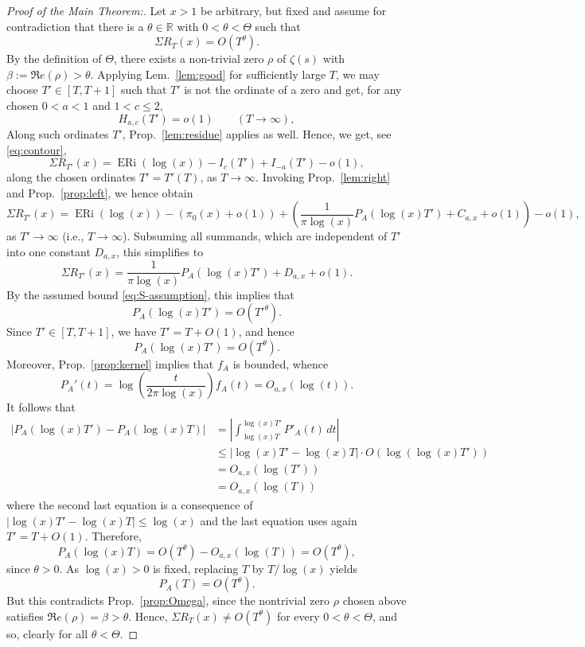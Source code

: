 \documentclass[a4paper,10pt]{amsart}
\DeclareMathOperator{\ERi}{ERi}
\theoremstyle{definition}
\numberwithin{equation}{section}
\def\R{\mathbb R}
\begin{document}
\begin{proof}[Proof of the Main Theorem:]
Let $x>1$ be arbitrary, but fixed and assume for contradiction that there is a $\theta\in\R$ with $0<\theta<\Theta$ such that
\begin{equation}\label{eq:S-assumption}
\Sigma R_T(x)=O(T^\theta).
\end{equation}
By the definition of $\Theta$, there exists a non-trivial zero $\rho$ of $\zeta(s)$ with $\beta:=\Re e(\rho)>\theta$. Applying Lem.\ \ref{lem:good} for sufficiently large $T$, we may choose $T'\in[T,T+1]$ such that $T'$ is not the ordinate of a zero and get, for any chosen $0<a<1$ and $1<c\leq 2$,
$$H_{a,c}(T')=o(1) \qquad(T\to\infty),$$
Along such ordinates $T'$, Prop.\ \ref{lem:residue} applies as well. Hence, we get, see \eqref{eq:contour},
\begin{equation}\label{eq:transfer-good}
\Sigma R_{T'}(x) = \ERi(\log(x))-I_c(T')+I_{-a}(T')-o(1),
\end{equation}
along the chosen ordinates $T'=T'(T)$, as $T\to\infty$. Invoking Prop.\ \ref{lem:right} and Prop.\ \ref{prop:left}, we hence obtain
$$ \Sigma R_{T'}(x) = \ERi(\log(x))-(\pi_0(x)+o(1))+\left(\frac1{\pi \log(x)}P_A(\log(x)T')+C_{a,x}+o(1)\right)-o(1),$$
as $T'\to\infty$ (i.e., $T\to\infty$). Subsuming all summands, which are independent of $T'$ into one constant $D_{a,x}$, this simplifies to
$$\Sigma R_{T'}(x) = \frac1{\pi \log(x)}P_A(\log(x)T')+D_{a,x}+o(1).$$
By the assumed bound \eqref{eq:S-assumption}, this implies that
\begin{equation}\label{eq:P-good-bound}
P_A(\log(x)T')=O(T'^\theta).
\end{equation}
Since $T'\in[T,T+1]$, we have $T'=T+O(1)$, and hence
$$
P_A(\log(x)T')=O(T^\theta).
$$
Moreover, Prop.\ \ref{prop:kernel} implies that $f_A$ is bounded, whence
$$
P_A'(t)=\log\left(\frac{t}{2\pi\log(x)}\right)f_A(t)=O_{a,x}(\log(t)).
$$
It follows that
$$
\begin{aligned}
|P_A(\log(x)T')-P_A(\log(x)T)| 
&=\left|\int_{\log(x)T}^{\log(x)T'} P'_A(t)\,dt\right|\\
&\leq |\log(x)T'-\log(x)T |  \cdot O(\log(\log(x)T')) \\
&=O_{a,x}(\log(T'))\\
&=O_{a,x}(\log(T))
\end{aligned}
$$
where the second last equation is a consequence of $|\log(x)T'-\log(x)T |\leq \log(x)$ and the last equation uses again $T'=T+O(1)$. Therefore,
$$
P_A(\log(x)T)=O(T^\theta)-O_{a,x}(\log(T))=O(T^\theta),
$$
since $\theta>0$. As $\log(x)>0$ is fixed, replacing $T$ by
$T/\log(x)$ yields
$$
P_A(T)=O(T^\theta).
$$
But this contradicts Prop.\ \ref{prop:Omega}, since the nontrivial zero $\rho$ chosen above satisfies $\Re e(\rho)=\beta>\theta$. Hence, $\Sigma R_T(x)\neq O(T^\theta)$ for every $0<\theta<\Theta$, and so, clearly for all $\theta<\Theta$.
\end{proof}
\end{document}
